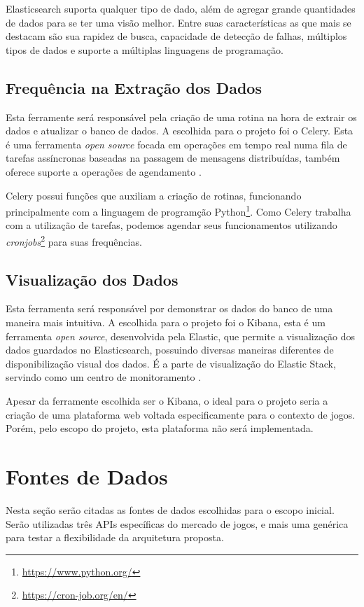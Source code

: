 Elasticsearch suporta qualquer tipo de dado, além de agregar grande quantidades de dados para se ter uma visão melhor. Entre suas características as que mais se destacam são sua rapidez de busca, capacidade de detecção de falhas, múltiplos tipos de dados e suporte a múltiplas linguagens de programação.
\subsection{Frequência na Extração dos Dados}
Esta ferramente será responsável pela criação de uma rotina na hora de extrair os dados e atualizar o banco de dados. A escolhida para o projeto foi o Celery. Esta é uma ferramenta \textit{open source} focada em operações em tempo real numa fila de tarefas assíncronas baseadas na passagem de mensagens distribuídas, também oferece suporte a operações de agendamento \cite{celery}.

Celery possui funções que auxiliam a criação de rotinas, funcionando principalmente com a linguagem de programção Python\footnote[2]{\url{https://www.python.org/}}. Como Celery trabalha com a utilização de tarefas, podemos agendar seus funcionamentos utilizando \textit{cronjobs}\footnote[3]{\url{https://cron-job.org/en/}} para suas frequências.
\subsection{Visualização dos Dados}
Esta ferramenta será responsável por demonstrar os dados do banco de uma maneira mais intuitiva. A escolhida para o projeto foi o Kibana, esta é um ferramenta \textit{open source}, desenvolvida pela Elastic, que permite a visualização dos dados guardados no Elasticsearch, possuindo diversas maneiras diferentes de disponibilização visual dos dados. É a parte de visualização do Elastic Stack, servindo como um centro de monitoramento \cite{kibana}.

Apesar da ferramente escolhida ser o Kibana, o ideal para o projeto seria a criação de uma plataforma web voltada especificamente para o contexto de jogos. Porém, pelo escopo do projeto, esta plataforma não será implementada.

\section{Fontes de Dados}
Nesta seção serão citadas as fontes de dados escolhidas para o escopo inicial. Serão utilizadas três APIs específicas do mercado de jogos, e mais uma genérica para testar a flexibilidade da arquitetura proposta.

